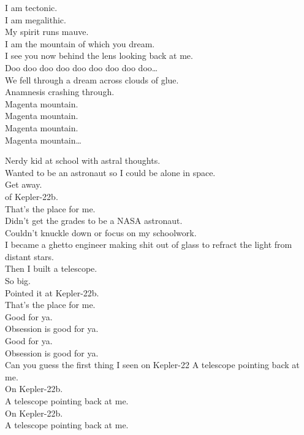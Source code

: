 I am tectonic. \\
I am megalithic. \\
My spirit runs mauve. \\
I am the mountain of which you dream. \\
I see you now behind the lens looking back at me. \\

Doo doo doo doo doo doo doo doo doo… \\
We fell through a dream across clouds of glue. \\
Anamnesis crashing through. \\

Magenta mountain. \\
Magenta mountain. \\
Magenta mountain. \\
Magenta mountain… \\




Nerdy kid at school with astral thoughts. \\
Wanted to be an astronaut so I could be alone in space. \\

Get away. \\
 of Kepler-22b. \\
That's the place for me. \\

Didn't get the grades to be a NASA astronaut. \\
Couldn't knuckle down or focus on my schoolwork. \\
I became a ghetto engineer making shit out of glass to refract the light from distant stars. \\
Then I built a telescope. \\
So big. \\
Pointed it at Kepler-22b. \\
That's the place for me. \\

Good for ya. \\
Obsession is good for ya. \\
Good for ya. \\
Obsession is good for ya. \\

Can you guess the first thing I seen on Kepler-22
A telescope pointing back at me. \\
On Kepler-22b. \\
A telescope pointing back at me. \\
On Kepler-22b. \\
A telescope pointing back at me. \\

